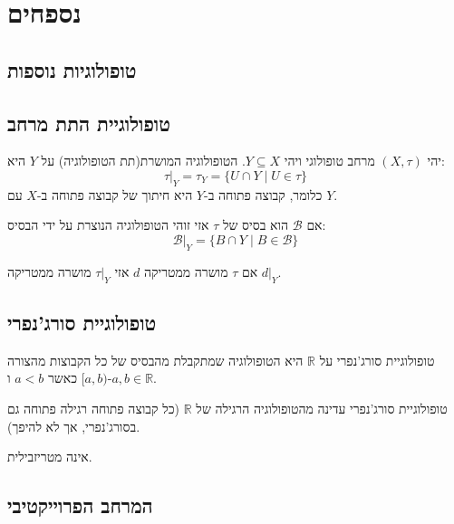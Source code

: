 \documentclass{tstextbook}
\begin{document}
\chapter{נספחים}

\section{טופולוגיות נוספות}

\section{טופולוגיית התת מרחב}

\begin{definition}
יהי \(\left( X,\tau \right)\) מרחב טופולוגי ויהי \(Y\subseteq X\). הטופולוגיה המושרת(תת הטופולוגיה) על \(Y\) היא:
$$\tau|_Y = \tau_Y = \{ U \cap Y \mid U \in \tau \}$$
כלומר, קבוצה פתוחה ב-\(Y\) היא חיתוך של קבוצה פתוחה ב-\(X\) עם \(Y\).

\end{definition}
\begin{proposition}
אם \(\mathcal{B}\) הוא בסיס של \(\tau\) אזי זוהי הטופולוגיה הנוצרת על ידי הבסיס:
$$\mathcal{B}|_{Y}=\{ B\cap Y\mid B \in \mathcal{B} \}$$

\end{proposition}
\begin{proposition}
אם \(\tau\) מושרה ממטריקה \(d\) אזי \(\tau|_{Y}\) מושרה ממטריקה \(d|_{Y}\).

\end{proposition}
\section{טופולוגיית סורג'נפרי}

\begin{definition}
טופולוגיית סורג'נפרי על \(\mathbb{R}\) היא הטופולוגיה שמתקבלת מהבסיס של כל הקבוצות מהצורה \([a, b)\) כאשר \(a < b\) ו-\(a, b \in \mathbb{R}\).

\end{definition}
\begin{proposition}
טופולוגיית סורג'נפרי עדינה מהטופולוגיה הרגילה של \(\mathbb{R}\) (כל קבוצה פתוחה רגילה פתוחה גם בסורג'נפרי, אך לא להיפך).

\end{proposition}
\begin{proposition}
אינה מטריזבילית.

\end{proposition}
\section{המרחב הפרוייקטיבי}
\end{document}
